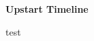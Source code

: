 \documentclass[11pt]{article}
\begin{document}
  \begin{center}
  \Large{\textbf{Upstart Timeline}}
  \end{center}

\begin{todolist}
  \item test
\end{todolist}

\end{document}
